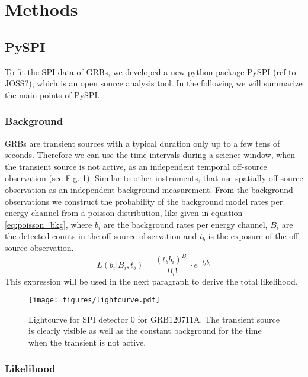 \documentclass[twocolumn]{aa}
\begin{document}
\section{Methods}
\subsection{PySPI}
\label{pyspi}
To fit the SPI data of GRBs, we developed a new python package PySPI (ref to JOSS?), which is an open source analysis tool. In the following we will summarize the main points of PySPI.

\subsubsection*{Background}

GRBs are transient sources with a typical duration only up to a few tens of seconds. Therefore we can use the time intervals during a science window, when the transient source is not active, as an independent temporal off-source observation (see Fig. \ref{fig:lightcurve}). Similar to other instruments, that use spatially off-source observation as an independent background measurement. From the background observations we construct the probability of the background model rates per energy channel from a poisson distribution, like given in equation \ref{eq:poisson_bkg}, where $b_{i}$ are the background rates per energy channel, $B_{i}$ are the detected counts in the off-source observation and $t_{b}$ is the exposure of the off-source observation.
\begin{equation}
	L(b_{i}|B_{i}, t_{b})=\frac{(t_{b} b_{i})^{B_{i}}}{B_{i}!}\cdot e^{-t_{b} b_{i}}
  \label{eq:poisson_bkg}
\end{equation}
This expression will be used in the next paragraph to derive the total likelihood.

\begin{figure}
    \begin{centering}
        \texttt{[image: figures/lightcurve.pdf]}
        \caption{Lightcurve for SPI detector 0 for GRB120711A. The transient source is clearly visible as well as the constant background for the time when the transient is not active.}
        \label{fig:lightcurve}
    \end{centering}
\end{figure}



\subsubsection*{Likelihood}
\end{document}
